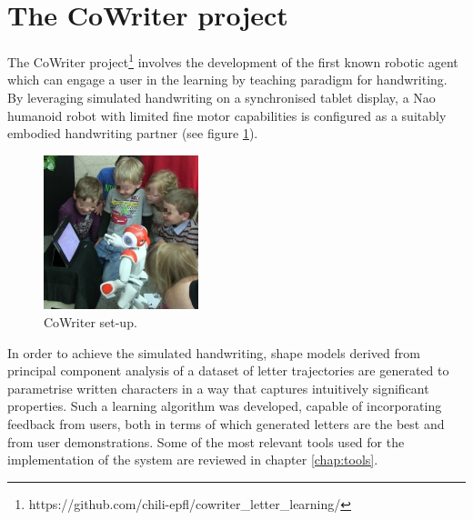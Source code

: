 \section{The CoWriter project}
The CoWriter project\footnote{https://github.com/chili-epfl/cowriter\_letter\_learning/} involves the development of the first known robotic agent which can engage a user in the learning by teaching paradigm for handwriting. By leveraging simulated handwriting on
a synchronised tablet display, a Nao humanoid robot with limited fine motor capabilities is configured as a suitably embodied handwriting partner (see figure \ref{fig:cowriter}).

\begin{figure}[h!]
        \centering
        \includegraphics[width=0.4\textwidth]{figures/cowriter.jpg}
        \caption{CoWriter set-up.}
        \label{fig:cowriter}
\end{figure}

In order to achieve the simulated handwriting, shape models derived from principal component analysis of a dataset of letter trajectories are generated to parametrise written characters in a way that captures intuitively significant properties. Such a learning algorithm was developed, capable of incorporating feedback from users, both in terms of which generated letters are the best and from user demonstrations. Some of the most relevant tools used for the implementation of the system are reviewed in chapter \ref{chap:tools}.



